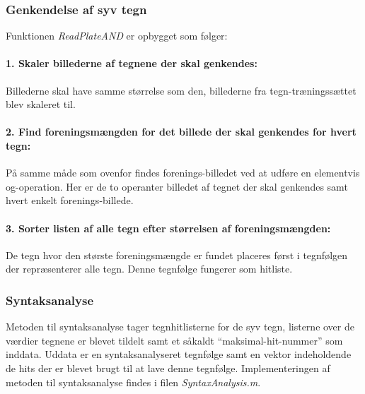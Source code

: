 
\subsubsection*{Genkendelse af syv tegn}

Funktionen \textit{ReadPlateAND} er opbygget som følger:

\paragraph{1. Skaler billederne af tegnene der skal genkendes:} Billederne skal have samme størrelse som den, billederne fra tegn-træningssættet blev skaleret til.

\paragraph{2. Find foreningsmængden for det billede der skal genkendes for hvert tegn:} På samme måde som ovenfor findes forenings-billedet ved at udføre en elementvis og-operation. Her er de to operanter billedet af tegnet der skal genkendes samt hvert enkelt forenings-billede.

\paragraph{3. Sorter listen af alle tegn efter størrelsen af foreningsmængden:} De tegn hvor den største foreningsmængde er fundet placeres først i tegnfølgen der repræsenterer alle tegn. Denne tegnfølge fungerer som hitliste.

\subsubsection{Syntaksanalyse}

Metoden til syntaksanalyse tager tegnhitlisterne for de syv tegn, listerne over de værdier tegnene er blevet tildelt samt et såkaldt ``maksimal-hit-nummer'' som inddata. Uddata er en syntaksanalyseret tegnfølge samt en vektor indeholdende de hits der er blevet brugt til at lave denne tegnfølge. Implementeringen af metoden til syntaksanalyse findes i filen \textit{SyntaxAnalysis.m}.

